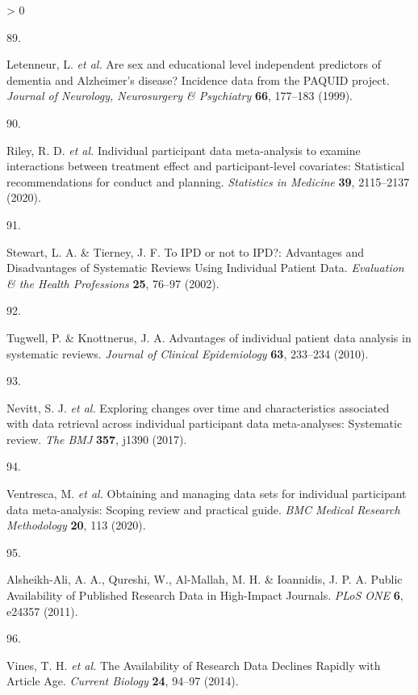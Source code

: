 \documentclass[a4paper, twoside]{templates/ociamthesis}
\newlength{\cslhangindent}
\newlength{\csllabelwidth}
\newenvironment{CSLReferences}[3] %
 {%
  \setlength{\parindent}{0pt}
  \ifodd #1 \everypar{\setlength{\hangindent}{\cslhangindent}}\ignorespaces\fi
  \ifnum #2 > 0
  \setlength{\parskip}{#2\baselineskip}
  \fi
 }%
 {}
\newcommand{\CSLLeftMargin}[1]{\parbox[t]{\maxof{\widthof{#1}}{\csllabelwidth}}{#1}}
\newcommand{\CSLRightInline}[1]{\parbox[t]{\linewidth - \csllabelwidth}{#1}}
\begin{document}
\begin{CSLReferences}{0}{0}
\leavevmode\hypertarget{ref-letenneur1999}{}%
\CSLLeftMargin{89. }
\CSLRightInline{Letenneur, L. \emph{et al.} Are sex and educational level independent predictors of dementia and {Alzheimer}'s disease? {Incidence} data from the {PAQUID} project. \emph{Journal of Neurology, Neurosurgery \& Psychiatry} \textbf{66}, 177--183 (1999).}

\leavevmode\hypertarget{ref-riley2020}{}%
\CSLLeftMargin{90. }
\CSLRightInline{Riley, R. D. \emph{et al.} Individual participant data meta-analysis to examine interactions between treatment effect and participant-level covariates: {Statistical} recommendations for conduct and planning. \emph{Statistics in Medicine} \textbf{39}, 2115--2137 (2020).}

\leavevmode\hypertarget{ref-stewart2002}{}%
\CSLLeftMargin{91. }
\CSLRightInline{Stewart, L. A. \& Tierney, J. F. To {IPD} or not to {IPD}?: {Advantages} and {Disadvantages} of {Systematic Reviews Using Individual Patient Data}. \emph{Evaluation \& the Health Professions} \textbf{25}, 76--97 (2002).}

\leavevmode\hypertarget{ref-tugwell2010}{}%
\CSLLeftMargin{92. }
\CSLRightInline{Tugwell, P. \& Knottnerus, J. A. Advantages of individual patient data analysis in systematic reviews. \emph{Journal of Clinical Epidemiology} \textbf{63}, 233--234 (2010).}

\leavevmode\hypertarget{ref-nevitt2017a}{}%
\CSLLeftMargin{93. }
\CSLRightInline{Nevitt, S. J. \emph{et al.} Exploring changes over time and characteristics associated with data retrieval across individual participant data meta-analyses: Systematic review. \emph{The BMJ} \textbf{357}, j1390 (2017).}

\leavevmode\hypertarget{ref-ventresca2020}{}%
\CSLLeftMargin{94. }
\CSLRightInline{Ventresca, M. \emph{et al.} Obtaining and managing data sets for individual participant data meta-analysis: Scoping review and practical guide. \emph{BMC Medical Research Methodology} \textbf{20}, 113 (2020).}

\leavevmode\hypertarget{ref-alsheikh-ali2011}{}%
\CSLLeftMargin{95. }
\CSLRightInline{Alsheikh-Ali, A. A., Qureshi, W., Al-Mallah, M. H. \& Ioannidis, J. P. A. Public {Availability} of {Published Research Data} in {High}-{Impact Journals}. \emph{PLoS ONE} \textbf{6}, e24357 (2011).}

\leavevmode\hypertarget{ref-vines2014}{}%
\CSLLeftMargin{96. }
\CSLRightInline{Vines, T. H. \emph{et al.} The {Availability} of {Research Data Declines Rapidly} with {Article Age}. \emph{Current Biology} \textbf{24}, 94--97 (2014).}


\end{CSLReferences}
\end{document}
